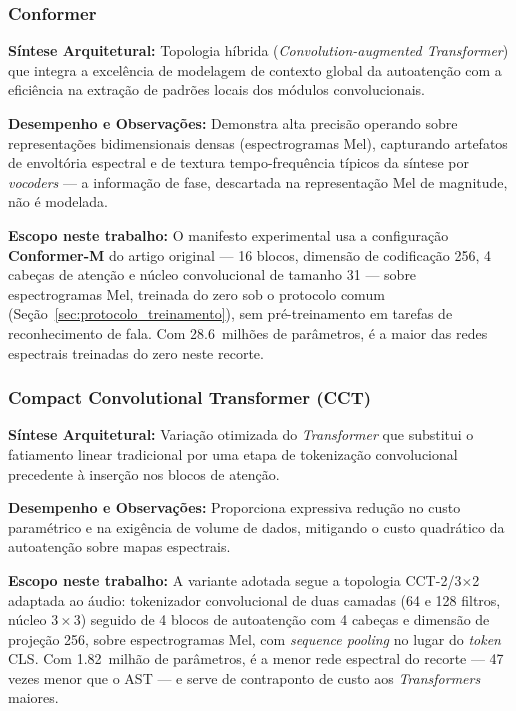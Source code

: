 \documentclass[12pt,a4paper]{article}
\begin{document}
\subsubsection[Conformer]{Conformer~\cite{gulati2020conformer}}
\textbf{Síntese Arquitetural:} Topologia híbrida (\textit{Convolution-augmented Transformer}) que integra a excelência de modelagem de contexto global da autoatenção com a eficiência na extração de padrões locais dos módulos convolucionais.
\par\textbf{Desempenho e Observações:} Demonstra alta precisão operando sobre representações bidimensionais densas (espectrogramas Mel), capturando artefatos de envoltória espectral e de textura tempo-frequência típicos da síntese por \textit{vocoders} --- a informação de fase, descartada na representação Mel de magnitude, não é modelada.
\par\textbf{Escopo neste trabalho:} O manifesto experimental usa a
configuração \textbf{Conformer-M} do artigo original --- \num{16} blocos,
dimensão de codificação \num{256}, \num{4} cabeças de atenção e núcleo
convolucional de tamanho \num{31} --- sobre espectrogramas Mel, treinada do
zero sob o protocolo comum (Seção~\ref{sec:protocolo_treinamento}), sem
pré-treinamento em tarefas de reconhecimento de fala. Com
\num{28,6}~milhões de parâmetros, é a maior das redes espectrais treinadas do
zero neste recorte.

\subsubsection[Compact Convolutional Transformer (CCT)]{Compact Convolutional Transformer (CCT)~\cite{hassani2021cct}}
\textbf{Síntese Arquitetural:} Variação otimizada do \textit{Transformer} que substitui o fatiamento linear tradicional por uma etapa de tokenização convolucional precedente à inserção nos blocos de atenção.
\par\textbf{Desempenho e Observações:} Proporciona expressiva redução no custo paramétrico e na exigência de volume de dados, mitigando o custo quadrático da autoatenção sobre mapas espectrais.
\par\textbf{Escopo neste trabalho:} A variante adotada segue a topologia
CCT-2/3$\times$2 adaptada ao áudio: tokenizador convolucional de duas camadas
(\num{64} e \num{128} filtros, núcleo $3\times3$) seguido de \num{4} blocos de
autoatenção com \num{4} cabeças e dimensão de projeção \num{256}, sobre
espectrogramas Mel, com \textit{sequence pooling} no lugar do \textit{token}
CLS. Com \num{1,82}~milhão de parâmetros, é a menor rede espectral do recorte
--- \num{47} vezes menor que o AST --- e serve de contraponto de custo
aos \textit{Transformers} maiores.
\end{document}
